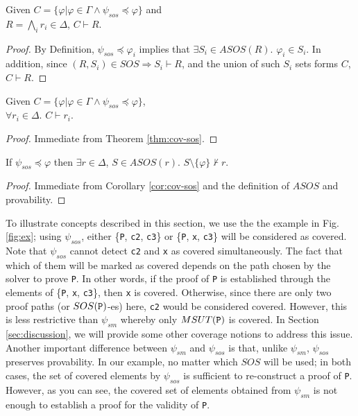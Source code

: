 \begin{theorem}
\label{thm:cov-sos}
Given $C = \{\varphi | \varphi \in \Gamma \wedge  \psi_{sos} \preccurlyeq \varphi \}$
and \\ $R = \bigwedge_{i} {r_i \in \Delta}$, $C \vdash R$.
\end{theorem}
\begin{proof}
By Definition, $\psi_{sos} \preccurlyeq \varphi_i$ implies that $\exists S_i \in ASOS(R)$. $\varphi_i \in S_i$.
In addition, since $(R, S_i) \in SOS \Rightarrow S_i \vdash R$, and the union of such $S_i$ sets
forms $C$,
$C \vdash R$.
\end{proof}
\vspace{2mm}

\begin{coroll}
\label{cor:cov-sos}
Given $C = \{\varphi | \varphi \in \Gamma \wedge  \psi_{sos} \preccurlyeq \varphi \}$, \\
$\forall r_i \in \Delta$. $C \vdash r_i$.
\end{coroll}
\begin{proof}
Immediate from Theorem \ref{thm:cov-sos}.
\end{proof}
\vspace{2mm}

\begin{theorem}
\label{thm:sos-r}
If $\psi_{sos} \preccurlyeq \varphi$ then $\exists r \in \Delta$, $S \in ASOS(r)$.
$S \setminus \{\varphi \} \nvdash r$.
\end{theorem}
\begin{proof}
Immediate from Corollary \ref{cor:cov-sos} and the definition of $ASOS$ and provability.
\end{proof}
\vspace{2mm}
To illustrate concepts described in this section, we use the the example in Fig. \ref{fig:ex}; 
using $\psi_{sos}$, either \{{\tt P}, {\tt c2}, {\tt c3}\} or
 \{{\tt P}, {\tt x}, {\tt c3}\} will be considered as covered. Note that
 $\psi_{sos}$ cannot detect {\tt c2} and {\tt x} as covered simultaneously. 
 The fact that which of them will be marked as covered depends on 
 the path chosen by the solver to prove {\tt P}. In other words, 
 if the proof of {\tt P} is established through the elements of \{{\tt P}, {\tt x}, {\tt c3}\}, 
 then {\tt x} is covered. Otherwise, since there are only two proof paths (or $SOS({\tt P})$-es) 
 here, {\tt c2} would be considered covered. However, this is less restrictive than $\psi_{sm}$ whereby only $MSUT({\tt P})$ is covered. In Section \ref{sec:discussion}, we will provide some other coverage notions to address this issue.
 Another important difference between $\psi_{sm}$ and $\psi_{sos}$ is that, unlike $\psi_{sm}$,
 $\psi_{sos}$ preserves provability. In our example, no matter which $SOS$ will be used;
 in both cases, the set of covered elements by $\psi_{sos}$ is sufficient to re-construct a proof of {\tt P}.
 However, as you can see, the covered set of elements obtained from $\psi_{sm}$ is not
 enough to establish a proof for the validity of {\tt P}.

